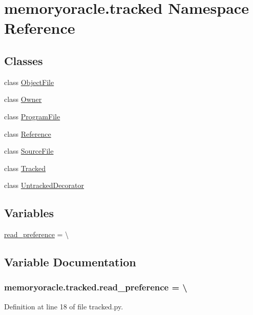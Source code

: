 \hypertarget{namespacememoryoracle_1_1tracked}{}\section{memoryoracle.\+tracked Namespace Reference}
\label{namespacememoryoracle_1_1tracked}
\subsection*{Classes}
\begin{DoxyCompactItemize}
\item 
class \hyperlink{classmemoryoracle_1_1tracked_1_1ObjectFile}{Object\+File}
\item 
class \hyperlink{classmemoryoracle_1_1tracked_1_1Owner}{Owner}
\item 
class \hyperlink{classmemoryoracle_1_1tracked_1_1ProgramFile}{Program\+File}
\item 
class \hyperlink{classmemoryoracle_1_1tracked_1_1Reference}{Reference}
\item 
class \hyperlink{classmemoryoracle_1_1tracked_1_1SourceFile}{Source\+File}
\item 
class \hyperlink{classmemoryoracle_1_1tracked_1_1Tracked}{Tracked}
\item 
class \hyperlink{classmemoryoracle_1_1tracked_1_1UntrackedDecorator}{Untracked\+Decorator}
\end{DoxyCompactItemize}
\subsection*{Variables}
\begin{DoxyCompactItemize}
\item 
\hyperlink{namespacememoryoracle_1_1tracked_abbbb518ae7eb9bb7ba5e5fd927248325}{read\+\_\+preference} = \textbackslash{}
\end{DoxyCompactItemize}


\subsection{Variable Documentation}
\hypertarget{namespacememoryoracle_1_1tracked_abbbb518ae7eb9bb7ba5e5fd927248325}{}
\subsubsection[{read\+\_\+preference}]{\setlength{\rightskip}{0pt plus 5cm}memoryoracle.\+tracked.\+read\+\_\+preference = \textbackslash{}}\label{namespacememoryoracle_1_1tracked_abbbb518ae7eb9bb7ba5e5fd927248325}


Definition at line 18 of file tracked.\+py.

